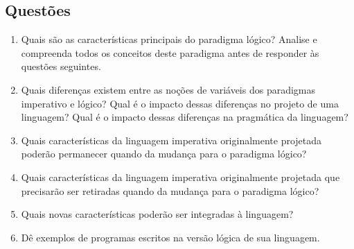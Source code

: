 \documentclass[12pt, a4paper]{article}
\begin{document}
    \subsection{Questões}
    \begin{enumerate}[leftmargin=*]
        \item %
        Quais são as características principais do paradigma lógico? Analise e
        compreenda todos os conceitos deste paradigma antes de responder às
        questões seguintes.

        \item %
        Quais diferenças existem entre as noções de variáveis dos paradigmas
        imperativo e lógico? Qual é o impacto dessas diferenças no projeto de
        uma linguagem? Qual é o impacto dessas diferenças na pragmática da
        linguagem?

        \item %
        Quais características da linguagem imperativa originalmente projetada
        poderão permanecer quando da mudança para o paradigma lógico?

        \item %
        Quais características da linguagem imperativa originalmente projetada
        que precisarão ser retiradas quando da mudança para o paradigma lógico?

        \item %
        Quais novas características poderão ser integradas à linguagem?

        \item %
        Dê exemplos de programas escritos na versão lógica de sua linguagem.

    \end{enumerate}
\end{document}
